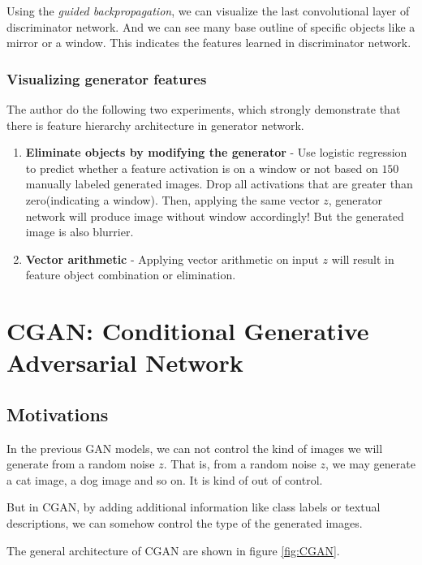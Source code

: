\documentclass{article} %
\begin{document}
Using the \emph{guided backpropagation}, we can visualize the last convolutional layer of discriminator network. And we can see many base outline of specific objects like a mirror or a window. This indicates the features learned in discriminator network.

\subsubsection{Visualizing generator features}

The author do the following two experiments, which strongly demonstrate that there is feature hierarchy architecture in generator network.

\begin{enumerate}
    \item \textbf{Eliminate objects by modifying the generator} - Use logistic regression to predict whether a feature activation is on a window or not based on $150$ manually labeled generated images. Drop all activations that are greater than zero(indicating a window). Then, applying the same vector $z$, generator network will produce image without window accordingly! But the generated image is also blurrier.
    \item \textbf{Vector arithmetic} - Applying vector arithmetic on input $z$ will result in feature object combination or elimination.
\end{enumerate}

\newpage

\section{CGAN: Conditional Generative Adversarial Network}

\subsection{Motivations}

In the previous GAN models, we can not control the kind of images we will generate from a random noise $z$. That is, from a random noise $z$, we may generate a cat image, a dog image and so on. It is kind of out of control.

But in CGAN, by adding additional information like class labels or textual descriptions, we can somehow control the type of the generated images. 

The general architecture of CGAN are shown in figure \ref{fig:CGAN}.
\end{document}
